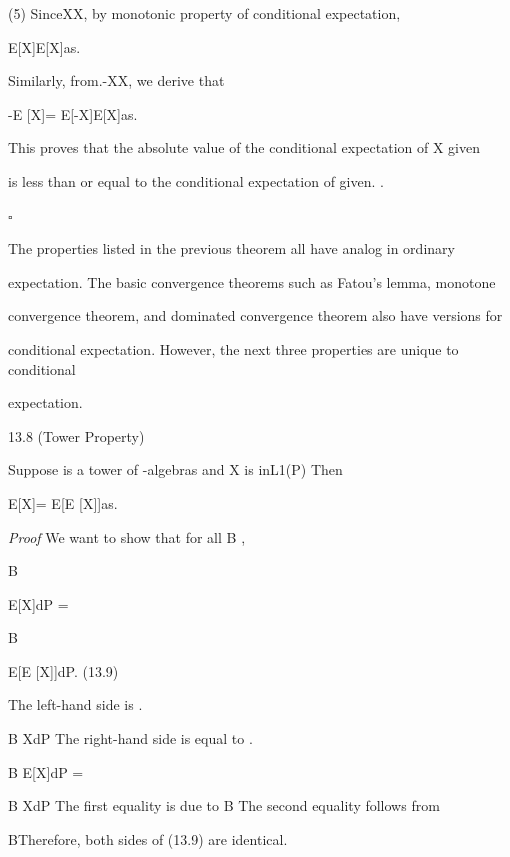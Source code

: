 (5) SinceX\leq\vert X\vert, by monotonic property of conditional expectation,

E[X\vert{}]\leq E[\vert X\vert\vert {}]as.

Similarly, from.-X\leq\vert X\vert, we derive that

-E [X\vert{}]= E[-X\vert{}]\leq E[\vert X\vert\vert {}]as.

This proves that the absolute value of the conditional expectation of X given 

is less than or equal to the conditional expectation of \vertX\vert given. .

\hfill $\square$

The properties listed in the previous theorem all have analog in ordinary

expectation. The basic convergence theorems such as Fatou's lemma, monotone

convergence theorem, and dominated convergence theorem also have versions for

conditional expectation. However, the next three properties are unique to conditional

expectation.

\begin{thmbox}{13.8 (Tower Property)}
\end{thmbox}

Suppose  is a tower of \sigma-algebras and X is inL1(P) Then

E[X\vert{}]= E[E [X\vert{}]\vert{}]as.

\textit{Proof} We want to show that for all B\in {} ,

\int

B

E[X\vert{}]dP =

\int

B

E[E [X\vert{}]\vert{}]dP. (13.9)

The left-hand side is .

\int

B XdP The right-hand side is equal to .

\int

B E[X\vert{}]dP =\int

B XdP The first equality is due to B\in {} The second equality follows from

B\in {}Therefore, both sides of (13.9) are identical.

